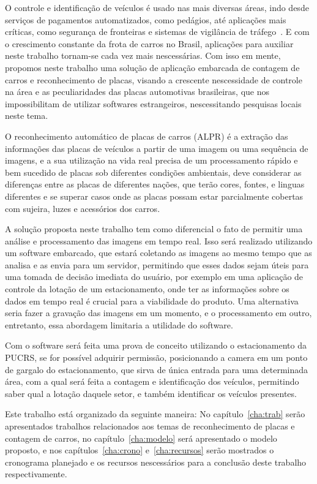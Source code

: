 
O controle e identificação de veículos é usado nas mais diversas áreas, indo
desde serviços de pagamentos automatizados, como pedágios, até aplicações mais
críticas, como segurança de fronteiras e sistemas de vigilância de
tráfego~\cite{ahmad2015automatic}. E com o crescimento constante da frota de
carros no Brasil, aplicações para auxiliar neste trabalho tornam-se cada vez
mais nescessárias.  Com isso em mente, propomos neste trabalho uma solução de
aplicação embarcada de contagem de carros e reconhecimento de placas, visando a
crescente nescessidade de controle na área e as peculiaridades das placas
automotivas brasileiras, que nos impossibilitam de utilizar softwares
estrangeiros, nescessitando pesquisas locais neste tema.

O reconhecimento automático de placas de carros (ALPR) é a extração das
informações das placas de veículos a partir de uma imagem ou uma sequência de
imagens, e a sua utilização na vida real precisa de um processamento rápido e
bem sucedido de placas sob diferentes condições ambientais, deve considerar as
diferenças entre as placas de diferentes nações, que terão cores, fontes, e
linguas diferentes e se superar casos onde as placas possam estar parcialmente
cobertas com sujeira, luzes e acessórios dos carros.~\cite{s2013automatic}

A solução proposta neste trabalho tem como diferencial o fato de permitir uma
análise e processamento das imagens em tempo real. Isso será realizado
utilizando um software embarcado, que estará coletando as imagens ao mesmo tempo
que as analisa e as envia para um servidor, permitindo que esses dados sejam
úteis para uma tomada de decisão imediata do usuário, por exemplo em uma
aplicação de controle da lotação de um estacionamento, onde ter as informações
sobre os dados em tempo real é crucial para a viabilidade do produto. Uma
alternativa seria fazer a gravação das imagens em um momento, e o processamento
em outro, entretanto, essa abordagem limitaria a utilidade do software.

Com o software será feita uma prova de conceito utilizando o estacionamento da
PUCRS, se for possível adquirir permissão, posicionando a camera em um ponto de
gargalo do estacionamento, que sirva de única entrada para uma determinada área,
com a qual será feita a contagem e identificação dos veículos, permitindo saber
qual a lotação daquele setor, e também identificar os veículos presentes.

Este trabalho está organizado da seguinte maneira: No capítulo~\ref{cha:trab}
serão apresentados trabalhos relacionados aos temas de reconhecimento de placas
e contagem de carros, no capítulo~\ref{cha:modelo} será apresentado o modelo
proposto, e nos capítulos~\ref{cha:crono}  e~\ref{cha:recursos} serão mostrados
o cronograma planejado e os recursos nescessários para a conclusão deste
trabalho respectivamente.

